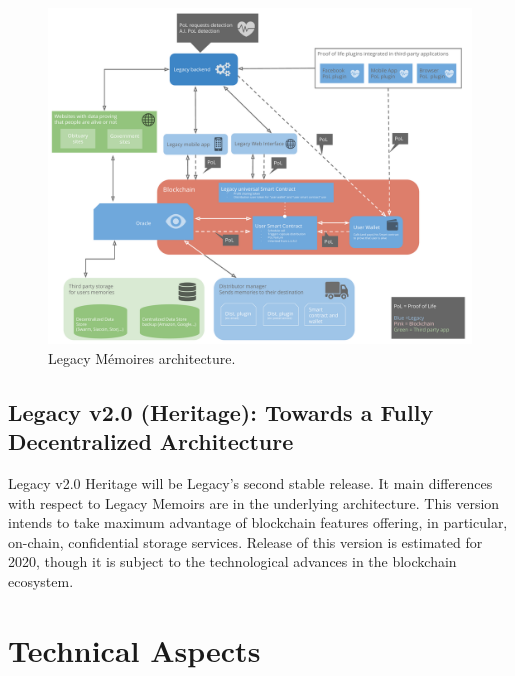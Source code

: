 \begin{figure}[h]
  \centering
  \includegraphics[scale=0.3]{fig/architecture_v02_hybrid}
  \caption{Legacy Mémoires architecture.}
  \label{fig:leg_v1_arch}
\end{figure} 


\subsection{Legacy v2.0 (Heritage): Towards a Fully Decentralized Architecture} %
\label{sub:legacy_v2_0_heritage_towards_a_fully_decentralized_architecture}
Legacy v2.0 Heritage will be Legacy’s second stable release. It main differences with respect to Legacy Memoirs are in the underlying architecture. This version intends to take maximum advantage of blockchain features offering, in particular, on-chain, confidential storage services. Release of this version is estimated for 2020, though it is subject to the technological advances in the blockchain ecosystem.


\section{Technical Aspects} %
\label{sec:technical_aspects}

